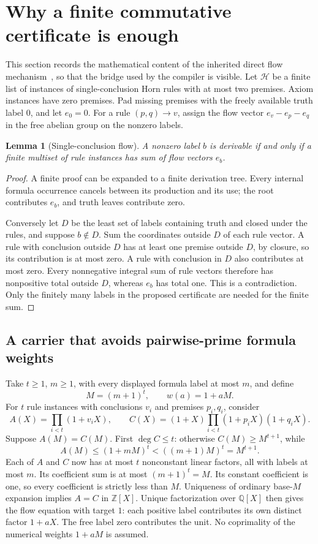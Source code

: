 \documentclass[11pt,letterpaper]{article}
\newtheorem{lemma}[theorem]{Lemma}
\newcommand{\Z}{\mathbb Z}
\begin{document}


\section{Why a finite commutative certificate is enough}
\label{sec:flow}

This section records the mathematical content of the inherited direct
flow mechanism~\cite{flow}, so that the bridge used by the compiler is
visible. Let $\mathcal H$ be a finite list of instances of
single-conclusion Horn rules with at most two premises. Axiom instances
have zero premises. Pad missing premises with the freely available truth
label $0$, and let $e_0=0$. For a rule $(p,q)\to v$, assign the flow
vector $e_v-e_p-e_q$ in the free abelian group on the nonzero labels.

\begin{lemma}[Single-conclusion flow]
A nonzero label $b$ is derivable if and only if a finite multiset of
rule instances has sum of flow vectors $e_b$.
\end{lemma}
\begin{proof}
A finite proof can be expanded to a finite derivation tree. Every internal
formula occurrence cancels between its production and its use; the root
contributes $e_b$, and truth leaves contribute zero.

Conversely let $D$ be the least set of labels containing truth and closed
under the rules, and suppose $b\notin D$. Sum the coordinates outside
$D$ of each rule vector. A rule with conclusion outside $D$ has at least
one premise outside $D$, by closure, so its contribution is at most zero.
A rule with conclusion in $D$ also contributes at most zero.
Every nonnegative integral sum of rule vectors therefore has nonpositive
total outside $D$, whereas $e_b$ has total one. This is a contradiction.
Only the finitely many labels in the proposed certificate are needed
for the finite sum.
\end{proof}

\subsection{A carrier that avoids pairwise-prime formula weights}

Take $t\ge1$, $m\ge1$, with every displayed formula label at most $m$,
and define
\[
 M=(m+1)^t,\qquad w(a)=1+aM.
\]
For $t$ rule instances with conclusions $v_i$ and premises $p_i,q_i$,
consider
\[
 A(X)=\prod_{i<t}(1+v_iX),\qquad
 C(X)=(1+X)\prod_{i<t}(1+p_iX)(1+q_iX).
\]
Suppose $A(M)=C(M)$. First $\deg C\le t$: otherwise
$C(M)\ge M^{t+1}$, while
\[
 A(M)\le(1+mM)^t<((m+1)M)^t=M^{t+1}.
\]
Each of $A$ and $C$ now has at most $t$ nonconstant linear factors, all
with labels at most $m$. Its coefficient sum is at most
$(m+1)^t=M$. Its constant coefficient is one, so every coefficient is
strictly less than $M$. Uniqueness of ordinary base-$M$ expansion implies
$A=C$ in $\Z[X]$. Unique factorization over $\mathbb Q[X]$ then gives
the flow equation with target $1$: each positive label contributes its
own distinct factor $1+aX$. The free label zero contributes the unit.
No coprimality of the numerical weights $1+aM$ is assumed.
\end{document}
